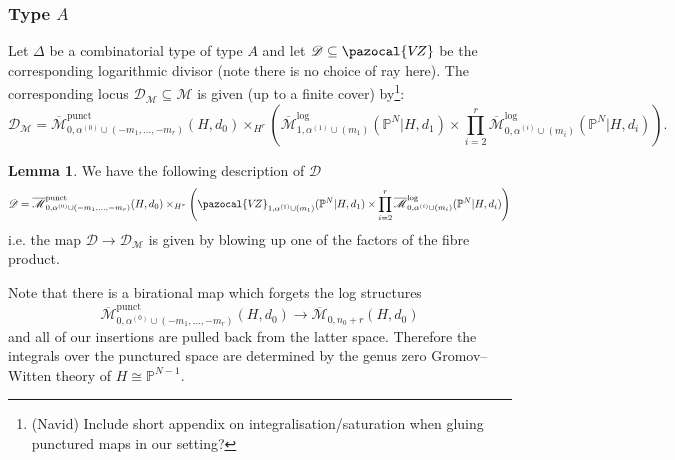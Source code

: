\documentclass[11pt]{amsart}
\newcommand{\M}[4]{\overline{\mathcal{M}}_{#1,#2}(#3,#4)}
\newcommand{\Mlog}[4]{\overline{\mathcal{M}}^{\operatorname{log}}_{#1,#2}(#3,#4)}
\newcommand{\Mpunct}[4]{\overline{\mathcal{M}}^{\operatorname{punct}}_{#1,#2}(#3,#4)}
\newcommand{\PP}{\mathbb P}
\newcommand{\VZ}{\pazocal{V\!Z}}
\renewcommand{\to}{\rightarrow}
\newcommand{\Mcal}{\mathcal{M}}
\newcommand{\Dcal}{\mathcal{D}}
\theoremstyle{definition}
\newtheorem{lemma}[thm]{Lemma}
\theoremstyle{definition}
\begin{document}
\subsubsection{Type $A$} Let $\Delta$ be a combinatorial type of type $A$ and let $\Dcal\subseteq\VZ$ be the corresponding logarithmic divisor (note there is no choice of ray here). The corresponding locus $\Dcal_\Mcal\subseteq\Mcal$ is given (up to a finite cover) by\footnote{(Navid) Include short appendix on integralisation/saturation when gluing punctured maps in our setting?}:
\begin{equation*}\Dcal_\Mcal=\Mpunct{0}{\alpha^{(0)}\cup (-m_1,\ldots,-m_r)}{H}{d_0}\times_{H^r}\left( \Mlog{1}{\alpha^{(1)}\cup(m_1)}{\PP^N|H}{d_1} \times \prod_{i=2}^r\Mlog{0}{\alpha^{(i)}\cup(m_i)}{\PP^N|H}{d_i} \right). \end{equation*}
\begin{lemma}We have the following description of $\Dcal$\begin{equation}\label{type A splitting axiom}\Dcal=\Mpunct{0}{\alpha^{(0)}\cup (-m_1,\ldots,-m_r)}{H}{d_0}\times_{H^r}\left(\VZ_{1,\alpha^{(1)}\cup(m_1)}(\PP^N|H,d_1)\times\prod_{i=2}^r\Mlog{0}{\alpha^{(i)}\cup(m_i)}{\PP^N|H}{d_i}\right) \end{equation}
i.e. the map $\Dcal\to\Dcal_\Mcal$ is given by blowing up one of the factors of the fibre product.\end{lemma} Note that there is a birational map which forgets the log structures
\begin{equation*} \Mpunct{0}{\alpha^{(0)}\cup(-m_1,\ldots,-m_r)}{H}{d_0} \to \M{0}{n_0+r}{H}{d_0} \end{equation*}
and all of our insertions are pulled back from the latter space. Therefore the integrals over the punctured space are determined by the genus zero Gromov--Witten theory of $H\cong\PP^{N-1}$.

\end{document}
